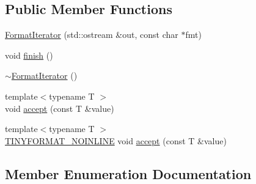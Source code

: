 \subsection*{Public Member Functions}
\begin{DoxyCompactItemize}
\item 
\hyperlink{classtinyformat_1_1detail_1_1_format_iterator_a798e0f475996df1b0a4f93540d96791b}{Format\+Iterator} (std\+::ostream \&out, const char $\ast$fmt)
\item 
void \hyperlink{classtinyformat_1_1detail_1_1_format_iterator_a46377a804f72dbad1e508d2fbaa18ce9}{finish} ()
\item 
\hyperlink{classtinyformat_1_1detail_1_1_format_iterator_a700ea30dbed93c28c499ac01c59a78a4}{$\sim$\+Format\+Iterator} ()
\item 
{\footnotesize template$<$typename T $>$ }\\void \hyperlink{classtinyformat_1_1detail_1_1_format_iterator_a2a2b99ea3a371e1ff8d56d8c8b801bdb}{accept} (const T \&value)
\item 
{\footnotesize template$<$typename T $>$ }\\\hyperlink{tinyformat_8h_a6aa2353acc671b972658fd73a813b960}{T\+I\+N\+Y\+F\+O\+R\+M\+A\+T\+\_\+\+N\+O\+I\+N\+L\+I\+N\+E} void \hyperlink{classtinyformat_1_1detail_1_1_format_iterator_a914be2066071c01cac4c2ea867c9d89a}{accept} (const T \&value)
\end{DoxyCompactItemize}


\subsection{Member Enumeration Documentation}
\hypertarget{classtinyformat_1_1detail_1_1_format_iterator_a219d15b3b08e2e2039043d2e992cc0b4}{}
